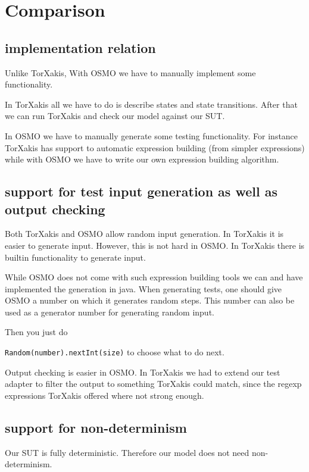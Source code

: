 \documentclass[11pt,a4paper]{article}
\begin{document}
\section{Comparison}
\subsection{implementation relation}
Unlike TorXakis, With OSMO we have to manually implement some functionality.

In TorXakis all we have to do is describe states and state
transitions. After that we can run TorXakis and check our model
against our SUT.

In OSMO we have to manually generate some testing functionality. For
instance TorXakis has support to automatic expression building (from
simpler expressions) while with OSMO we have to write our own
expression building algorithm.

\subsection{support for test input generation as well as output checking}

Both TorXakis and OSMO allow random input generation. In TorXakis it
is easier to generate input. However, this is not hard in OSMO. In
TorXakis there is builtin functionality to generate input.

While OSMO does not come with such expression building tools we can
and have implemented the generation in java. When generating tests,
one should give OSMO a number on which it generates random steps. This
number can also be used as a generator number for generating random
input.

Then you just do

\verb|Random(number).nextInt(size)| to choose what to do next.

Output checking is easier in OSMO. In TorXakis we had to extend our
test adapter to filter the output to something TorXakis could match,
since the regexp expressions TorXakis offered where not strong enough.

\subsection{support for non-determinism}
Our SUT is fully deterministic. Therefore our model does not need
non-determinism.
\end{document}
